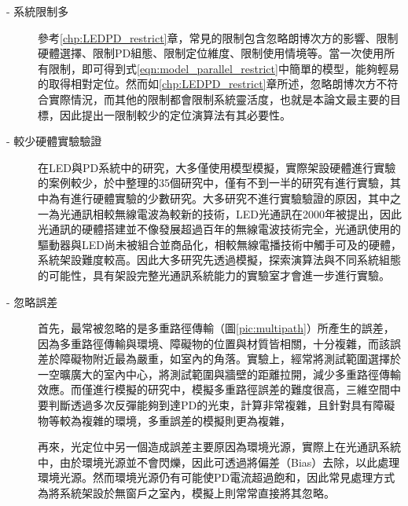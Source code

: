     \begin{description}

        \item[- 系統限制多]\hfill 
        
        \qquad
        參考\ref{chp:LEDPD_restrict}章，常見的限制包含忽略朗博次方的影響、限制硬體選擇、限制PD組態、限制定位維度、限制使用情境等。當一次使用所有限制，即可得到式\ref{eqn:model_parallel_restrict}中簡單的模型，能夠輕易的取得相對定位。然而如\ref{chp:LEDPD_restrict}章所述，忽略朗博次方不符合實際情況，而其他的限制都會限制系統靈活度，也就是本論文最主要的目標，因此提出一限制較少的定位演算法有其必要性。
        
        \item[- 較少硬體實驗驗證]\hfill 
        
        \qquad
        在LED與PD系統中的研究，大多僅使用模型模擬，實際架設硬體進行實驗的案例較少，於\cite{survey_light2018}中整理的35個研究中，僅有不到一半的研究有進行實驗，其中\cite{case:hypercube}\cite{case:3d_layers}為有進行硬體實驗的少數研究。大多研究不進行實驗驗證的原因，其中之一為光通訊相較無線電波為較新的技術，LED光通訊在2000年被提出\cite{vlc}，因此光通訊的硬體搭建並不像發展超過百年的無線電波技術完全，光通訊使用的驅動器與LED尚未被組合並商品化\cite{vlc_adv}，相較無線電播技術中觸手可及的硬體，系統架設難度較高。因此大多研究先透過模擬，探索演算法與不同系統組態的可能性，具有架設完整光通訊系統能力的實驗室才會進一步進行實驗。


        \item[- 忽略誤差]\hfill 

        \qquad
        首先，最常被忽略的是多重路徑傳輸（圖\ref{pic:multipath}）所產生的誤差，因為多重路徑傳輸與環境、障礙物的位置與材質皆相關，十分複雜，而該誤差於障礙物附近最為嚴重，如室內的角落。實驗上，經常將測試範圍選擇於一空曠廣大的室內中心，將測試範圍與牆壁的距離拉開，減少多重路徑傳輸效應。而僅進行模擬的研究中，模擬多重路徑誤差的難度很高\cite{multipath}，三維空間中要判斷透過多次反彈能夠到達PD的光束，計算非常複雜，且針對具有障礙物等較為複雜的環境，多重誤差的模擬則更為複雜，

        再來，光定位中另一個造成誤差主要原因為環境光源，實際上在光通訊系統中，由於環境光源並不會閃爍，因此可透過將偏差（Bias）去除，以此處理環境光源。然而環境光源仍有可能使PD電流超過飽和，因此常見處理方式為將系統架設於無窗戶之室內，模擬上則常常直接將其忽略。

    \end{description}






